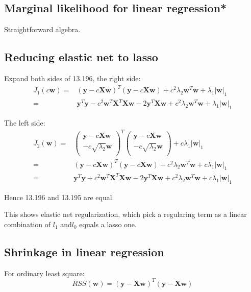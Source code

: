 \documentclass[UTF8]{ctexart}
\begin{document}
\subsection{Marginal likelihood for linear regression*}
Straightforward algebra.

\subsection{Reducing elastic net to lasso}
Expand both sides of 13.196, the right side:
\begin{align}
J_{1}(c\textbf{w})=&(\textbf{y}-c\textbf{X}\textbf{w})^{T}(\textbf{y}-c\textbf{X}\textbf{w}) + c^{2}\lambda_{2}\textbf{w}^{T}\textbf{w} + \lambda_{1}|\textbf{w}|_{1}\nonumber \\
=&\textbf{y}^{T}\textbf{y} - c^{2}\textbf{w}^{T}\textbf{X}^{T}\textbf{X}\textbf{w} - 2 \textbf{y}^{T}\textbf{X}\textbf{w} + c^{2}\lambda_{2}\textbf{w}^{T}\textbf{w} + \lambda_{1}|\textbf{w}|_{1}\nonumber
\end{align}

The left side:
\begin{align}
J_{2}(\textbf{w})=&\begin{pmatrix}  
\textbf{y}-c\textbf{X}\textbf{w} \\
-c \sqrt{\lambda_{2}}\textbf{w} \\
\end{pmatrix}^{T}\begin{pmatrix}  
\textbf{y}-c\textbf{X}\textbf{w} \\
-c \sqrt{\lambda_{2}}\textbf{w} \\
\end{pmatrix}+c \lambda_{1}|\textbf{w}|_{1}\nonumber \\
=&(\textbf{y}-c\textbf{X}\textbf{w})^{T}(\textbf{y}-c\textbf{X}\textbf{w})+c^{2}\lambda_{2}\textbf{w}^{T}\textbf{w} +c \lambda_{1}|\textbf{w}|_{1}\nonumber \\
=&\textbf{y}^{T}\textbf{y}+ c^{2}\textbf{w}^{T}\textbf{X}^{T}\textbf{X}\textbf{w} - 2\textbf{y}^{T}\textbf{X}\textbf{w}+c^{2}\lambda_{2}\textbf{w}^{T}\textbf{w}+c\lambda_{1}|\textbf{w}|_{1}\nonumber
\end{align}

Hence 13.196 and 13.195 are equal.

This shows elastic net regularization, which pick a regularing term as a linear combination of $l_{1}$ and$l_{0}$ equals a lasso one.

\subsection{Shrinkage in linear regression}
For ordinary least square:
$$RSS(\textbf{w}) = (\textbf{y}-\textbf{X}\textbf{w})^{T}(\textbf{y}-\textbf{X}\textbf{w})$$
\end{document}
